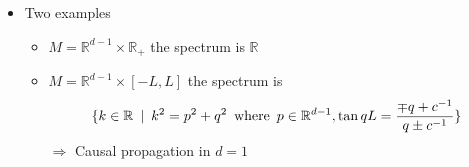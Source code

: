\documentclass[english]{beamer}
\begin{document}
\begin{frame}[shrink=40]
\begin{itemize}
\item<3-> Two examples 

	\begin{itemize}
		\item<4-> $M = \mathbb{R}^{d-1}\times \mathbb{R}_+$ the spectrum is $\mathbb{R}$
		\item<5-> $M = \mathbb{R}^{d-1}\times [-L, L]$ the spectrum is
		\begin{equation*}
		\{k\in\mathbb{R} \enskip\vert\enskip k^2 = p^2 + q^2 \enskip\mathrm{ where }\enskip p\in\mathbb{R}^{d-1}, \tan q L = \frac{\mp q + c^{-1}}{q \pm c^{-1}}\}
		\end{equation*}
		$\Rightarrow$ Causal propagation in $d=1$
	\end{itemize}
\end{itemize}

\end{frame}
\end{document}
